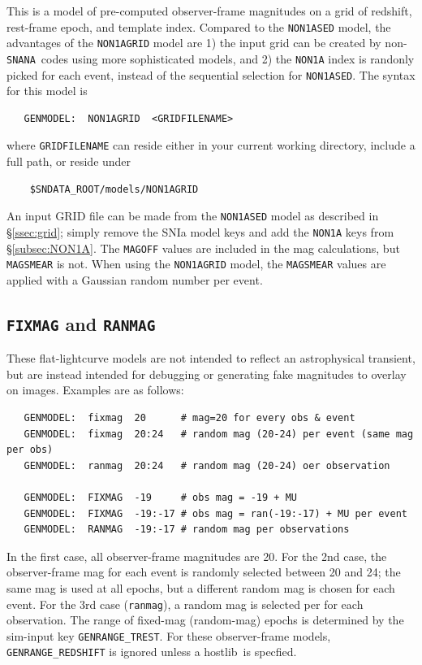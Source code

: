 \documentclass[12pt]{article}
\newcommand{\FIXMAG}{{\tt FIXMAG}}
\newcommand{\RANMAG}{{\tt RANMAG}}
\newcommand{\snana}{{\tt SNANA}}
\newcommand{\hostlib}{{\sc hostlib}}
\begin{document}
This is a model of pre-computed observer-frame magnitudes on 
a grid of redshift, rest-frame epoch, and template index.
Compared to the {\tt NON1ASED} model, the advantages of
the {\tt NON1AGRID} model are 1) the input grid can be
created by non-\snana\ codes using more sophisticated models,
and 2) the {\tt NON1A} index is randonly picked for each event,
instead of the sequential selection for {\tt NON1ASED}.
The syntax for this model is
\begin{verbatim}
   GENMODEL:  NON1AGRID  <GRIDFILENAME>
\end{verbatim}
%
where {\tt GRIDFILENAME} can reside either in your current
working directory, include a full path, or reside under
\begin{verbatim}
    $SNDATA_ROOT/models/NON1AGRID
\end{verbatim}
%
An input GRID file can be made from the {\tt NON1ASED} model
as described in \S\ref{ssec:grid}; simply remove the SNIa model
keys and add the {\tt NON1A} keys from \S\ref{subsec:NON1A}.
The {\tt MAGOFF} values are included in the mag calculations,
but {\tt MAGSMEAR} is not. When using the {\tt NON1AGRID} model,
the {\tt MAGSMEAR} values are applied with a Gaussian random
number per event.

\subsection{{\FIXMAG} and {\RANMAG}}
\label{subsec:fixmag}

These flat-lightcurve models are not intended to reflect an 
astrophysical transient, but are instead intended for debugging 
or generating fake magnitudes to overlay on images.
Examples are as follows:
%
\begin{verbatim}
   GENMODEL:  fixmag  20      # mag=20 for every obs & event
   GENMODEL:  fixmag  20:24   # random mag (20-24) per event (same mag per obs)
   GENMODEL:  ranmag  20:24   # random mag (20-24) oer observation

   GENMODEL:  FIXMAG  -19     # obs mag = -19 + MU
   GENMODEL:  FIXMAG  -19:-17 # obs mag = ran(-19:-17) + MU per event
   GENMODEL:  RANMAG  -19:-17 # random mag per observations
\end{verbatim}
%
In the first case, all observer-frame magnitudes are 20.
For the 2nd case, the observer-frame mag 
for each event is randomly selected between 20 and 24;
the same mag is used at all epochs, but a different random mag
is chosen for each event. 
For the 3rd case ({\tt ranmag}), a random mag is selected per for each observation.
The range of fixed-mag (random-mag) epochs is determined by the sim-input key 
\verb|GENRANGE_TREST|.
For these observer-frame models, 
\verb|GENRANGE_REDSHIFT| is ignored unless a \hostlib\ is specfied.
\end{document}
